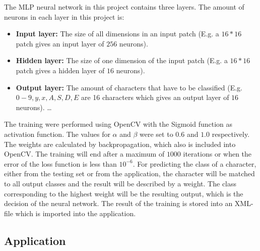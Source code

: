 \documentclass[12pt]{report}
\begin{document}
The MLP neural network in this project contains three layers. The amount of neurons in each layer in this project is:

\begin{itemize}  
\item \textbf{Input layer:} The size of all dimensions in an input patch (E.g. a $16*16$ patch gives an input layer of $256$ neurons).
\item \textbf{Hidden layer:} The size of one dimension of the input patch (E.g. a $16*16$ patch gives a hidden layer of $16$ neurons).
\item \textbf{Output layer:} The amount of characters that have to be classified (E.g. $0-9, y, x, A, S, D, E$ are 16 characters which gives an output layer of $16$ neurons). \ldots 
\end{itemize}
The training were performed using OpenCV with the Sigmoid function as activation function. The values for $\alpha$ and $\beta$ were set to $0.6$ and $1.0$ respectively. The weights are calculated by backpropagation, which also is included into OpenCV. The training will end after a maximum of $1000$ iterations or when the error of the loss function is less than $10^{-6}$. For predicting the class of a character, either from the testing set or from the application, the character will be matched to all output classes and the result will be described by a weight. The class corresponding to the highest weight will be the resulting output, which is the decision of the neural network. The result of the training is stored into an XML-file which is imported into the application. 


\subsection*{Application}
\end{document}
